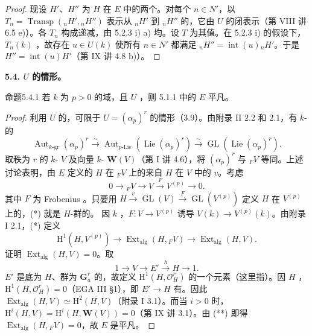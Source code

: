 \begin{proof}
现设 $H'$、$H''$ 为 $H$ 在 $E$ 中的两个。对每个 $n\in N'$，以 $T_n=\operatorname{Transp}({}_nH',{}_nH'')$ 表示从 ${}_nH'$ 到 ${}_nH''$ 的，它由 $U$ 的闭表示（第 VIII 讲 6.5 e)）。各 $T_n$ 构成递减，由 5.2.3 i) a) 均。设 $T$ 为其值。在 5.2.3 i) 的假设下，$T_n(k)$ ，故存在 $u\in U(k)$ 使所有 $n\in N'$ 都满足 ${}_nH''=\operatorname{int}(u){}_nH'$。于是 $H''=\operatorname{int}(u)H'$（第 IX 讲 4.8 b)）。
\end{proof}

\textbf{5.4. $U$ 的情形。}
\begin{SGAresult}{命题}{5.4.1}
若 $k$ 为 $p>0$ 的域，且 $U$ ，则 5.1.1 中的 $E$ 平凡。
\end{SGAresult}
\begin{proof}
利用 $U$ 的，可限于 $U=(\alpha_p)^r$ 的情形（3.9）。由附录 II 2.2 和 2.1，有 $k$-的
\[\operatorname{Aut}_{k\text{-gr}}(\alpha_p)^r\xrightarrow{\sim}
\operatorname{Aut}_{p\text{-Lie}}(\operatorname{Lie}(\alpha_p)^r)\xrightarrow{\sim}
\operatorname{GL}(\operatorname{Lie}(\alpha_p)^r).\]
取秩为 $r$ 的 $k$- $V$ 及向量 $k$- $\mathbf W(V)$（第 I 讲 4.6），将 $(\alpha_p)^r$ 与 ${}_FV$ 等同。上述讨论表明，由 $E$ 定义的 $H$ 在 ${}_FV$ 上的来自 $H$ 在 $V$ 中的 $v$。考虑
\[0\longrightarrow{}_FV\longrightarrow V\xrightarrow{F}V^{(p)}\longrightarrow0.\tag{*}\]
其中 $F$ 为 Frobenius 。只要用 $H\xrightarrow v\operatorname{GL}(V)\xrightarrow F\operatorname{GL}(V^{(p)})$ 定义 $H$ 在 $V^{(p)}$ 上的，(*) 就是 $H$-群的。
因 $k$ ，$F:V\to V^{(p)}$ 诱导 $V(k)\to V^{(p)}(k)$。由附录 I 2.1，(*) 定义
\[\mathrm H^1(H,V^{(p)})\longrightarrow\operatorname{Ext}_{\mathrm{alg}}(H,{}_FV)\longrightarrow\operatorname{Ext}_{\mathrm{alg}}(H,V).\tag{**}\]
证明 $\operatorname{Ext}_{\mathrm{alg}}(H,V)=0$。取
\[1\longrightarrow V\longrightarrow E'\xrightarrow h H\longrightarrow1.\]
 $E'$ 是底为 $H$、群为 $\mathbf G_a^r$ 的，故定义 $\mathrm H^1(H,\mathscr O_H^r)$ 的一个元素（这里指）。因 $H$ ，$\mathrm H^1(H,\mathscr O_H^r)=0$（EGA III §1），即 $E'\to H$ 有。因此 $\operatorname{Ext}_{\mathrm{alg}}(H,V)\simeq\mathrm H^2(H,V)$（附录 I 3.1）。而当 $i>0$ 时，$\mathrm H^i(H,V)=\mathrm H^i(H,\mathbf W(V))=0$（第 IX 讲 3.1）。由 (**) 即得 $\operatorname{Ext}_{\mathrm{alg}}(H,{}_FV)=0$，故 $E$ 是平凡。
\end{proof}

